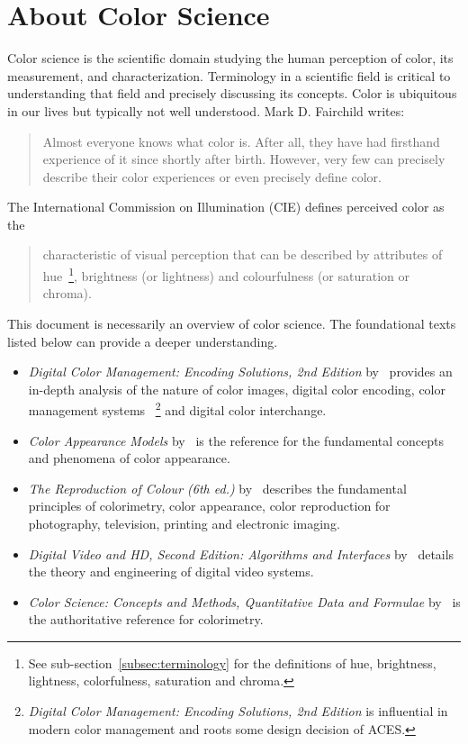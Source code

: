 \section{About Color Science}%
\label{sec:about-color-science}

Color science is the scientific domain studying the human perception of color,
its measurement, and characterization. Terminology in a scientific field is
critical to understanding that field and precisely discussing its concepts.
Color is ubiquitous in our lives but typically not well understood.
\ccpar{}
Mark D. Fairchild writes:~\blockcquote[85]{Fairchild2013u}{Almost everyone
knows what color is. After all, they have had firsthand experience of it since
shortly after birth. However, very few can precisely describe their color
experiences or even precisely define color.}
\ccpar{}
The International Commission on Illumination (CIE) defines perceived color as
the~\blockcquote{CIEbk}{characteristic of visual perception that can be
described by attributes of hue~\footnote{See sub-section~\ref{subsec:terminology}
for the definitions of hue, brightness, lightness, colorfulness, saturation and
chroma.}, brightness (or lightness) and colourfulness (or saturation or
chroma).}
\ccpar{}
This document is necessarily an overview of color science. The foundational
texts listed below can provide a deeper understanding.
\begin{itemize}
    \item \textit{Digital Color Management: Encoding Solutions, 2nd Edition}
by~\textcite{Madden2007} provides an in-depth analysis of the nature of color
images, digital color encoding, color management systems
~\footnote{\textit{Digital Color Management: Encoding Solutions, 2nd Edition}
is influential in modern color management and roots some design decision of
ACES.} and digital color interchange.
    \item \textit{Color Appearance Models}
by~\textcite{Fairchild2013u} is the reference for the fundamental concepts and
phenomena of color appearance.
    \item \textit{The Reproduction of Colour (6th ed.)}
by~\textcite{Hunt2004b} describes the fundamental principles of colorimetry,
color appearance, color reproduction for photography, television, printing and
electronic imaging.
    \item \textit{Digital Video and HD, Second Edition: Algorithms and Interfaces}
by~\textcite{Poynton2012} details the theory and engineering of digital video
systems.
    \item \textit{Color Science: Concepts and Methods, Quantitative Data and Formulae}
by~\textcite{Wyszecki2000bi} is the authoritative reference for colorimetry.
\end{itemize}

